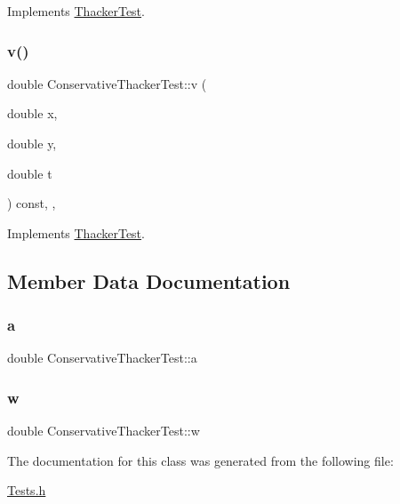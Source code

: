 Implements \hyperlink{classThackerTest_a622e4cd3846a7e6ea906111b6be6a0b7}{Thacker\+Test}.

\mbox{\label{classConservativeThackerTest_ada42cdb161739dc9b831eac7af8312a3}} 
\subsubsection{\texorpdfstring{v()}{v()}}
{\footnotesize\ttfamily double Conservative\+Thacker\+Test\+::v (\begin{DoxyParamCaption}\item[{double}]{x,  }\item[{double}]{y,  }\item[{double}]{t }\end{DoxyParamCaption}) const\hspace{0.3cm}{\ttfamily [inline]}, {\ttfamily [override]}, {\ttfamily [virtual]}}



Implements \hyperlink{classThackerTest_a445339d59012efde1e6d27ab060b6781}{Thacker\+Test}.



\subsection{Member Data Documentation}
\mbox{\label{classConservativeThackerTest_a072f15b9858803213064d262d61bfda7}} 
\subsubsection{\texorpdfstring{a}{a}}
{\footnotesize\ttfamily double Conservative\+Thacker\+Test\+::a\hspace{0.3cm}{\ttfamily [private]}}

\mbox{\label{classConservativeThackerTest_a7ee89cb012c8e7c1a6c171bb546eba55}} 
\subsubsection{\texorpdfstring{w}{w}}
{\footnotesize\ttfamily double Conservative\+Thacker\+Test\+::w\hspace{0.3cm}{\ttfamily [private]}}



The documentation for this class was generated from the following file\+:\begin{DoxyCompactItemize}
\item 
\hyperlink{Tests_8h}{Tests.\+h}\end{DoxyCompactItemize}

